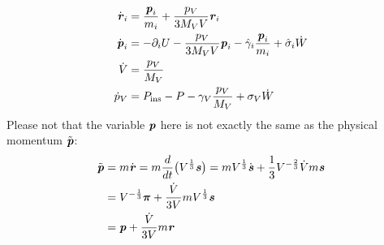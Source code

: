 \documentclass[aps, pre, preprint,unsortedaddress,a4paper,onecolumn]{revtex4}
\newcommand{\vect}[1]{\textbf{\textit{#1}}}
\newcommand{\mypi}{\boldsymbol\pi}
\newcommand{\ins}{\textrm{ins}}
\begin{document}
\begin{align}
  \dot{\vect r}_i
  &= \frac{\vect p_i}{m_i} + \frac{p_V}{3M_VV} \vect r_i\\
  \dot{\vect p}_i
  & =
  -\partial_i U - \frac{p_V}{3M_VV}\vect p_i - \hat\gamma_i\frac{\vect p_i}{m_i}
  + \hat\sigma_i\dot W\\
  \dot{V} 
  &=
  \frac{p_V}{M_V} \\
  \dot{p}_V
  &=
  P_\ins - P - \gamma_V  \frac{p_V}{M_V} + \sigma_V\dot W   
\end{align}
Please not that the variable $\vect p$ here is not exactly the same as the physical momentum $\tilde {\vect p}$:
\begin{align}\nonumber
  \tilde {\vect p}
  &= m \dot{\vect r}
  = m \frac{d}{dt}\big(V^{\frac13}\vect s\big)
  = m V^{\frac13}\dot{\vect s} + \frac13 V^{-\frac23}\dot Vm\vect s \\\nonumber
  & =
  V^{-\frac13}\mypi + \frac{\dot V}{3V}m V^{\frac13}\vect s \\
  &=
  \vect p + \frac{\dot V}{3V}m\vect r
\end{align}





% 
\end{document}
